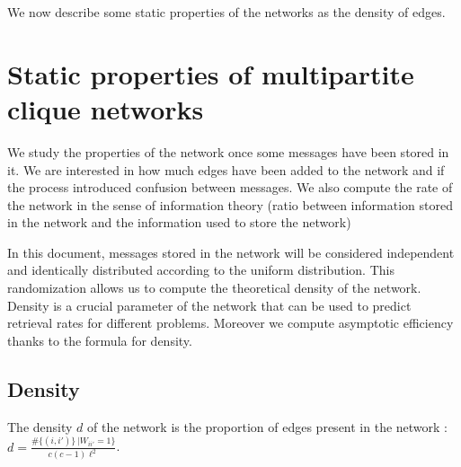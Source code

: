 \documentclass[english,10pt,twocolumn]{IEEEtran}
\renewcommand{\ge}{\geqslant}
\newcommand*\Let[2]{\State #1 $\gets$ #2}
\theoremstyle{definition}
\begin{document}
		
		
	
	We now describe some static properties of the networks as the density of edges.
	
	\section{Static properties of multipartite clique networks}	
	
	We study the properties of the network once some messages have been stored in it. We are interested in how much edges have been added to the network and if the process introduced confusion between messages. We also compute the rate of the network in the sense of information theory (ratio between information stored in the network and the information used to store the network)
	
	In this document, messages stored in the network will be considered independent and identically distributed according to the uniform distribution. This randomization allows us to compute the theoretical density of the network. %
	Density is a crucial parameter of the network that can be used to predict retrieval rates for different problems. Moreover we compute asymptotic efficiency thanks to the formula for density.
	
	\subsection{Density}
		
	The density $d$ of the network is the proportion of edges present in the network : $d = \frac{\# \{(i, i') \} \, | W_{ii'} = 1 \}}{c(c-1)\ell^2}$.
	
\end{document}
